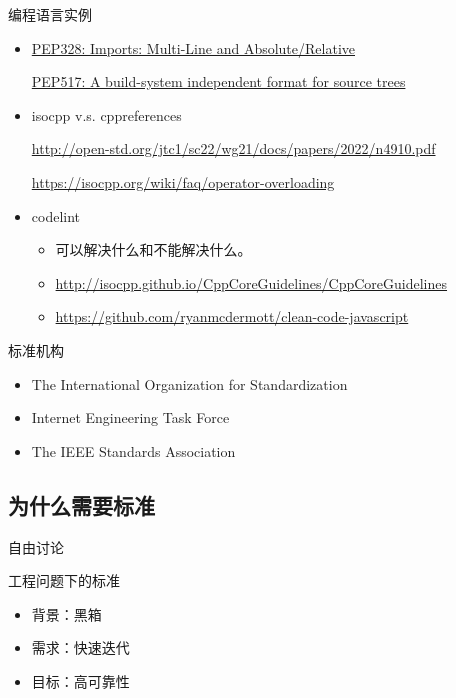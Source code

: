 \begin{frame}{编程语言实例}
    \begin{itemize}
        \item \href{https://peps.python.org/pep-0328/}{PEP328: Imports: Multi-Line and Absolute/Relative}
        
        \href{https://peps.python.org/pep-0517/}{PEP517: A build-system independent format for source trees}
        
        \item isocpp v.s. cppreferences
        
        \url{http://open-std.org/jtc1/sc22/wg21/docs/papers/2022/n4910.pdf}
        
        \url{https://isocpp.org/wiki/faq/operator-overloading}
        
        \item codelint
        \begin{itemize}
            \item 可以解决什么和不能解决什么。
            \item \url{http://isocpp.github.io/CppCoreGuidelines/CppCoreGuidelines}
            \item \url{https://github.com/ryanmcdermott/clean-code-javascript}
        \end{itemize}
    \end{itemize}
\end{frame}

\begin{frame}{标准机构}
    \begin{itemize}
        \item The International Organization for Standardization
        \item Internet Engineering Task Force
        \item The IEEE Standards Association
    \end{itemize}
\end{frame}

\subsection{为什么需要标准}

\begin{frame}{自由讨论}
    
\end{frame}

\begin{frame}{工程问题下的标准}
    \begin{itemize}
        \item 背景：黑箱
        \item 需求：快速迭代
        \item 目标：高可靠性
    \end{itemize}
\end{frame}

